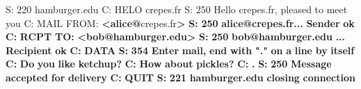\documentclass[
]{article}
\newenvironment{Shaded}{}{}
\newcommand{\ErrorTok}[1]{\textcolor[rgb]{1.00,0.00,0.00}{\textbf{#1}}}
\newcommand{\KeywordTok}[1]{\textcolor[rgb]{0.00,0.44,0.13}{\textbf{#1}}}
\newcommand{\NormalTok}[1]{#1}
\newcommand{\OtherTok}[1]{\textcolor[rgb]{0.00,0.44,0.13}{#1}}
\begin{document}
\begin{Shaded}
\begin{Highlighting}[]
\NormalTok{     S: 220 hamburger.edu }
\NormalTok{     C: HELO crepes.fr }
\NormalTok{     S: 250  Hello crepes.fr, pleased to meet you }
\NormalTok{     C: MAIL FROM: }\KeywordTok{\textless{}alice}\ErrorTok{@}\OtherTok{crepes.fr}\ErrorTok{\textgreater{}} 
     \ErrorTok{S:} \ErrorTok{250} \ErrorTok{alice@crepes.fr...} \ErrorTok{Sender} \ErrorTok{ok} 
     \ErrorTok{C:} \ErrorTok{RCPT} \ErrorTok{TO:} \ErrorTok{\textless{}bob@hamburger.edu\textgreater{}} 
     \ErrorTok{S:} \ErrorTok{250} \ErrorTok{bob@hamburger.edu} \ErrorTok{...} \ErrorTok{Recipient} \ErrorTok{ok} 
     \ErrorTok{C:} \ErrorTok{DATA} 
     \ErrorTok{S:} \ErrorTok{354} \ErrorTok{Enter} \ErrorTok{mail,} \ErrorTok{end} \ErrorTok{with} \ErrorTok{"."} \ErrorTok{on} \ErrorTok{a} \ErrorTok{line} \ErrorTok{by} \ErrorTok{itself} 
     \ErrorTok{C:} \ErrorTok{Do} \ErrorTok{you} \ErrorTok{like} \ErrorTok{ketchup?} 
     \ErrorTok{C:} \ErrorTok{How} \ErrorTok{about} \ErrorTok{pickles?} 
     \ErrorTok{C:} \ErrorTok{.} 
     \ErrorTok{S:} \ErrorTok{250} \ErrorTok{Message} \ErrorTok{accepted} \ErrorTok{for} \ErrorTok{delivery} 
     \ErrorTok{C:} \ErrorTok{QUIT} 
     \ErrorTok{S:} \ErrorTok{221} \ErrorTok{hamburger.edu} \ErrorTok{closing} \ErrorTok{connection}
\end{Highlighting}
\end{Shaded}
\end{document}
